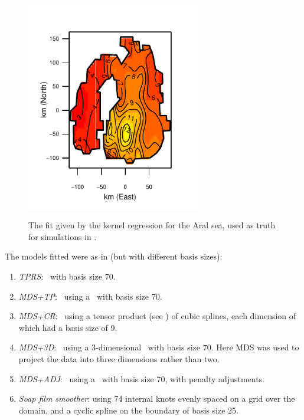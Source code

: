 {\begin{figure}
\centering
\includegraphics[width=3in]{mds/figs/aral-np.pdf} \\
\caption{The fit given by the kernel regression for the Aral sea, used as truth for simulations in .}
\label{aral-np}
\end{figure}

The models fitted were as in  (but with different basis sizes):

\begin{enumerate}
\item \emph{TPRS}: \tprs\ with basis size 70.
\item \emph{MDS+TP}: \mdsap\ using a \tprs\ with basis size 70.
\item \emph{MDS+CR}: \mdsap\ using a tensor product (see ) of cubic splines, each dimension of which had a basis size of 9.
\item \emph{MDS+3D}: \mdsap\  using a 3-dimensional \tprs\ with basis size 70. Here MDS was used to project the data into three dimensions rather than two.
\item \emph{MDS+ADJ}:  \mdsap\ using a \tprs\ with basis size 70, with penalty adjustments.
\item \emph{Soap film smoother}: using 74 internal knots evenly spaced on a grid over the domain, and a cyclic spline on the boundary of basis size 25.
\end{enumerate}

}
